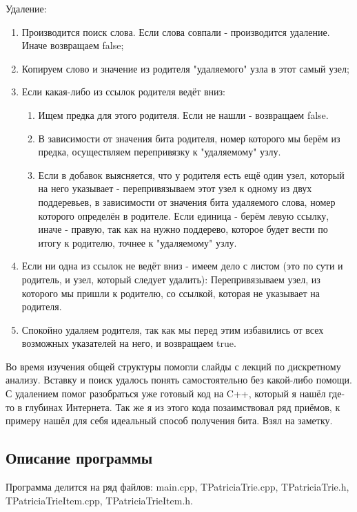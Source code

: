 \documentclass[12pt]{article}
\begin{document}
Удаление:
\begin{enumerate}
	\item Производится поиск слова. Если слова совпали - производится удаление. Иначе возвращаем false;
	\item Копируем слово и значение из родителя "удаляемого" узла в этот самый узел;
	\item Если какая-либо из ссылок родителя ведёт вниз:
	\begin{enumerate}
		\item Ищем предка для этого родителя. Если не нашли - возвращаем false.
		\item В зависимости от значения бита родителя, номер которого мы берём из предка, осуществляем перепривязку к "удаляемому" узлу.
		\item Если в добавок выясняется, что у родителя есть ещё один узел, который на него указывает - перепривязываем этот узел к одному из двух поддеревьев, в зависимости от значения бита удаляемого слова, номер которого определён в родителе. Если единица - берём левую ссылку, иначе - правую, так как на нужно поддерево, которое будет вести по итогу к родителю, точнее к "удаляемому" узлу.
	\end{enumerate}
	\item Если ни одна из ссылок не ведёт вниз - имеем дело с листом (это по сути и родитель, и узел, который следует удалить):
		\subitem Перепривязываем узел, из которого мы пришли к родителю, со ссылкой, которая не указывает на родителя.
	\item Спокойно удаляем родителя, так как мы перед этим избавились от всех возможных указателей на него, и возвращаем true.
\end{enumerate}

Во время изучения общей структуры помогли слайды с лекций по дискретному анализу. Вставку и поиск удалось понять самостоятельно без какой-либо помощи. С удалением помог разобраться уже готовый код на C++, который я нашёл где-то в глубинах Интернета. Так же я из этого кода позаимствовал ряд приёмов, к примеру нашёл для себя идеальный способ получения бита. Взял на заметку.

\subsection*{Описание программы}

Программа делится на ряд файлов: main.cpp, TPatriciaTrie.cpp, TPatriciaTrie.h, TPatriciaTrieItem.cpp, TPatriciaTrieItem.h.
\end{document}
